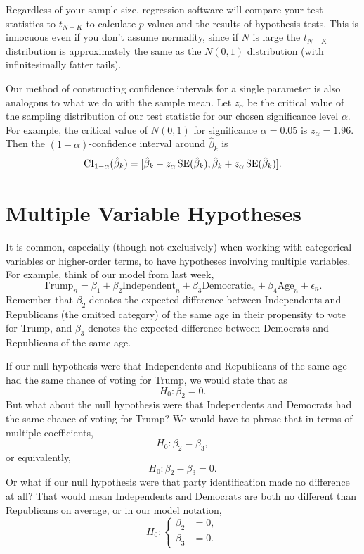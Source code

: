 \documentclass[12pt,oneside,openany]{book}
\begin{document}
Regardless of your sample size, regression software will compare your
test statistics to \(t_{N - K}\) to calculate \(p\)-values and the
results of hypothesis tests. This is innocuous even if you don't assume
normality, since if \(N\) is large the \(t_{N - K}\) distribution is
approximately the same as the \(N(0, 1)\) distribution (with
infinitesimally fatter tails).

Our method of constructing confidence intervals for a single parameter
is also analogous to what we do with the sample mean. Let \(z_{\alpha}\)
be the critical value of the sampling distribution of our test statistic
for our chosen significance level \(\alpha\). For example, the critical
value of \(N(0, 1)\) for significance \(\alpha = 0.05\) is
\(z_{\alpha} = 1.96\). Then the \((1 - \alpha)\)-confidence interval
around \(\hat{\beta}_k\) is \[
\mathop{\rm CI}\nolimits_{1 - \alpha}(\hat{\beta}_k) = [\hat{\beta}_k - z_{\alpha} \mathop{\rm SE}\nolimits(\hat{\beta}_k), \hat{\beta}_k + z_{\alpha} \mathop{\rm SE}\nolimits(\hat{\beta}_k)].
\]

\section{Multiple Variable
Hypotheses}\label{multiple-variable-hypotheses}

It is common, especially (though not exclusively) when working with
categorical variables or higher-order terms, to have hypotheses
involving multiple variables. For example, think of our model from last
week, \[
\text{Trump}_n = \beta_1 + \beta_2 \text{Independent}_n + \beta_3 \text{Democratic}_n + \beta_4 \text{Age}_n + \epsilon_n.
\] Remember that \(\beta_2\) denotes the expected difference between
Independents and Republicans (the omitted category) of the same age in
their propensity to vote for Trump, and \(\beta_3\) denotes the expected
difference between Democrats and Republicans of the same age.

If our null hypothesis were that Independents and Republicans of the
same age had the same chance of voting for Trump, we would state that as
\[
H_0 : \beta_2 = 0.
\] But what about the null hypothesis were that Independents and
Democrats had the same chance of voting for Trump? We would have to
phrase that in terms of multiple coefficients, \[
H_0 : \beta_2 = \beta_3,
\] or equivalently, \[
H_0 : \beta_2 - \beta_3 = 0.
\] Or what if our null hypothesis were that party identification made no
difference at all? That would mean Independents and Democrats are both
no different than Republicans on average, or in our model notation, \[
H_0 : \left\{ \begin{aligned}
\beta_2 &= 0, \\
\beta_3 &= 0.
\end{aligned} \right.
\]
\end{document}
